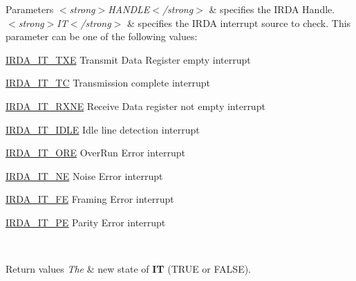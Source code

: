 \begin{DoxyParams}{Parameters}
{\em $<$strong$>$\+H\+A\+N\+D\+L\+E$<$/strong$>$} & specifies the I\+R\+DA Handle. \\
\hline
{\em $<$strong$>$\+I\+T$<$/strong$>$} & specifies the I\+R\+DA interrupt source to check. This parameter can be one of the following values\+: \begin{DoxyItemize}
\item \hyperlink{group___i_r_d_a___interrupt__definition_ga5e81e9fd3d52bafcf21281c10d2ca257}{I\+R\+D\+A\+\_\+\+I\+T\+\_\+\+T\+XE} Transmit Data Register empty interrupt \item \hyperlink{group___i_r_d_a___interrupt__definition_gadd3e4b796b67db171ca04c5297d4e667}{I\+R\+D\+A\+\_\+\+I\+T\+\_\+\+TC} Transmission complete interrupt \item \hyperlink{group___i_r_d_a___interrupt__definition_ga8f2de9c6c3cccfb2de0277ce10f23b13}{I\+R\+D\+A\+\_\+\+I\+T\+\_\+\+R\+X\+NE} Receive Data register not empty interrupt \item \hyperlink{group___i_r_d_a___interrupt__definition_ga32dfb69029c5576d82feb59129d11000}{I\+R\+D\+A\+\_\+\+I\+T\+\_\+\+I\+D\+LE} Idle line detection interrupt \item \hyperlink{group___i_r_d_a___interrupt__definition_ga25949256f4317d4520cc5a9f3a18b794}{I\+R\+D\+A\+\_\+\+I\+T\+\_\+\+O\+RE} Over\+Run Error interrupt \item \hyperlink{group___i_r_d_a___interrupt__definition_gabc87f825339853122d5cabb5c6ca462b}{I\+R\+D\+A\+\_\+\+I\+T\+\_\+\+NE} Noise Error interrupt \item \hyperlink{group___i_r_d_a___interrupt__definition_gac193cb9027e7425c022a160f172bf8b7}{I\+R\+D\+A\+\_\+\+I\+T\+\_\+\+FE} Framing Error interrupt \item \hyperlink{group___i_r_d_a___interrupt__definition_ga1d2b4b601ece8f1ab0b2542412bb2533}{I\+R\+D\+A\+\_\+\+I\+T\+\_\+\+PE} Parity Error interrupt \end{DoxyItemize}
\\
\hline
\end{DoxyParams}

\begin{DoxyRetVals}{Return values}
{\em The} & new state of {\bfseries IT} (T\+R\+UE or F\+A\+L\+SE). \\
\hline
\end{DoxyRetVals}
\mbox{\label{group___i_r_d_a___exported___macros_ga1c50dd0407d6e4159f90c9bc74545925}} 
